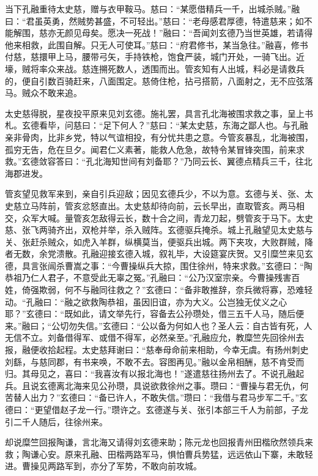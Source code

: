 当下孔融重待太史慈，赠与衣甲鞍马。慈曰：“某愿借精兵一千，出城杀贼。”融曰：“君虽英勇，然贼势甚盛，不可轻出。”慈曰：“老母感君厚德，特遣慈来；如不能解围，慈亦无颜见母矣。愿决一死战！”融曰：“吾闻刘玄德乃当世英雄，若请得他来相救，此围自解。只无人可使耳。”慈曰：“府君修书，某当急往。”融喜，修书付慈，慈擐甲上马，腰带弓矢，手持铁枪，饱食严装，城门开处，一骑飞出。近壕，贼将率众来战。慈连搠死数人，透围而出。管亥知有人出城，料必是请救兵的，便自引数百骑赶来，八面围定。慈倚住枪，拈弓搭箭，八面射之，无不应弦落马。贼众不敢来追。

太史慈得脱，星夜投平原来见刘玄德。施礼罢，具言孔北海被围求救之事，呈上书札。玄德看毕，问慈曰：“足下何人？”慈曰：“某太史慈，东海之鄙人也。与孔融亲非骨肉，比非乡党，特以气谊相投，有分忧共患之意。今管亥暴乱，北海被围，孤穷无告，危在旦夕。闻君仁义素著，能救人危急，故特令某冒锋突围，前来求救。”玄德敛容答曰：“孔北海知世间有刘备耶？”乃同云长、翼德点精兵三千，往北海郡进发。

管亥望见救军来到，亲自引兵迎敌；因见玄德兵少，不以为意。玄德与关、张、太史慈立马阵前，管亥忿怒直出。太史慈却待向前，云长早出，直取管亥。两马相交，众军大喊。量管亥怎敌得云长，数十合之间，青龙刀起，劈管亥于马下。太史慈、张飞两骑齐出，双枪并举，杀入贼阵。玄德驱兵掩杀。城上孔融望见太史慈与关、张赶杀贼众，如虎入羊群，纵横莫当，便驱兵出城。两下夹攻，大败群贼，降者无数，余党溃散。孔融迎接玄德入城，叙礼毕，大设筵宴庆贺。又引糜竺来见玄德，具言张闿杀曹嵩之事：“今曹操纵兵大掠，围住徐州，特来求救。”玄德曰：“陶恭祖乃仁人君子，不意受此无辜之冤。”孔融曰：“公乃汉室宗亲。今曹操残害百姓，倚强欺弱，何不与融同往救之？”玄德曰：“备非敢推辞，奈兵微将寡，恐难轻动。“孔融曰：“融之欲救陶恭祖，虽因旧谊，亦为大义。公岂独无仗义之心耶？”玄德曰：“既如此，请文举先行，容备去公孙瓒处，借三五千人马，随后便来。”融曰；“公切勿失信。”玄德曰：“公以备为何如人也？圣人云：自古皆有死，人无信不立。刘备借得军、或借不得军，必然亲至。”孔融应允，教糜竺先回徐州去报，融便收拾起程。太史慈拜谢曰：“慈奉母命前来相助，今幸无虞。有扬州刺史刘繇，与慈同郡，有书来唤，不敢不去。容图再见。”融以金帛相酬，慈不肯受而归。其母见之，喜曰：“我喜汝有以报北海也！”遂遣慈往扬州去了。不说孔融起兵。且说玄德离北海来见公孙瓒，具说欲救徐州之事。瓒曰：“曹操与君无仇，何苦替人出力？”玄德曰：“备已许人，不敢失信。”瓒曰：“我借与君马步军二千。”玄德曰：“更望借赵子龙一行。”瓒许之。玄德遂与关、张引本部三千人为前部，子龙引二千人随后，往徐州来。

却说糜竺回报陶谦，言北海又请得刘玄德来助；陈元龙也回报青州田楷欣然领兵来救；陶谦心安。原来孔融、田楷两路军马，惧怕曹兵势猛，远远依山下寨，未敢轻进。曹操见两路军到，亦分了军势，不敢向前攻城。

